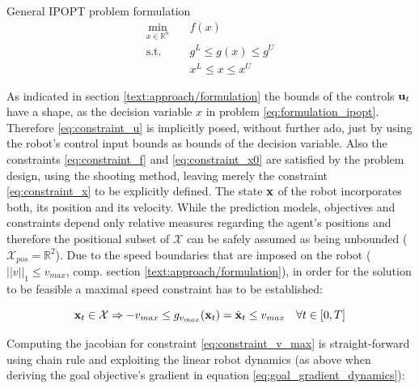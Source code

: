 \begin{problem}{General IPOPT problem formulation}
\begin{align}
\min_{x \in \mathbb{R}^n} \quad & f(x) \\
\textrm{s.t. } \quad & g^L \leq g(x) \leq g^U \\
& x^L \leq x \leq x^U 
\end{align}
\label{eq:formulation_ipopt}
\end{problem}

As indicated in section \ref{text:approach/formulation} the bounds of the controls $\mathbf{u}_t$ have a shape, as the decision variable $x$ in problem \ref{eq:formulation_ipopt}. Therefore \ref{eq:constraint_u} is implicitly posed, without further ado, just by using the robot's control input bounds as bounds of the decision variable. Also the constraints \ref{eq:constraint_f} and  \ref{eq:constraint_x0} are satisfied by the problem design, using the shooting method, leaving merely the constraint \ref{eq:constraint_x} to be explicitly defined. The state $\mathbf{x}$ of the robot incorporates both, its position and its velocity. While the prediction models, objectives and constraints depend only  relative measures regarding the agent's positions and therefore the positional subset of $\mathcal{X}$ can be safely assumed as being unbounded ($\mathcal{X}_{pos} = \mathbb{R}^2$). Due to the speed boundaries that are imposed on the robot ($||v||_1 \leq v_{max}$, comp. section \ref{text:approach/formulation}), in order for the solution to be feasible a maximal speed constraint has to be established:

\begin{equation}
\mathbf{x}_t \in \mathcal{X} \Rightarrow -v_{max} \leq g_{v_{max}}(\mathbf{x}_t) = \dot{\mathbf{x}}_t \leq v_{max} \quad \forall t \in [0, T]
\label{eq:constraint_v_max}
\end{equation}

Computing the jacobian for constraint \ref{eq:constraint_v_max} is straight-forward using chain rule and exploiting the linear robot dynamics (as above when deriving the goal objective's gradient in equation \ref{eq:goal_gradient_dynamics}):  

